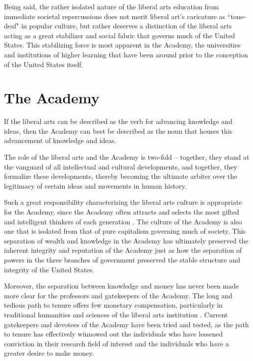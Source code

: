 \documentclass[12pt,letterpaper]{article}
\begin{document}
Being said, the rather isolated nature of the liberal arts education from immediate societal repercussions does not merit liberal art's caricature as ``tone-deaf" in popular culture, but rather deserves a distinction of the liberal arts acting as a great stabilizer and social fabric that governs much of the United States.  This stabilizing force is most apparent in the Academy,  the universities and institutions of higher learning that have been around prior to the conception of the United States itself.

\section{The Academy}
If the liberal arts can be described as the verb for advancing knowledge and ideas, then the Academy can best be described as the noun that houses this advancement of knowledge and ideas.

The role of the liberal arts and the Academy is two-fold -- together, they stand at the vanguard of all intellectual and cultural developments, and together, they formalize these developments, thereby becoming the ultimate arbiter over the legitimacy of certain ideas and movements in human history.

Such a great responsibility characterizing the liberal arts culture is appropriate for the Academy, since the Academy often attracts and selects the most gifted and intelligent thinkers of each generation \cite{}.  The culture of the Academy is also one that is isolated from that of pure capitalism governing much of society.  This separation of wealth and knowledge in the Academy has ultimately preserved the inherent integrity and reputation of the Academy just as how the separation of powers in the three branches of government preserved the stable structure and integrity of the United States.  


Moreover, the separation between knowledge and money has never been made more clear for the professors and gatekeepers of the Academy.  The long and tedious path to tenure offers few monetary compensation, particularly in traditional humanities and sciences of the liberal arts institution \cite{}.  Current gatekeepers and devotees of the Academy have been tried and tested, as the path to tenure has effectively winnowed out the individuals who have lessened conviction in their research field of interest and the individuals who have a greater desire to make money.
\end{document}
